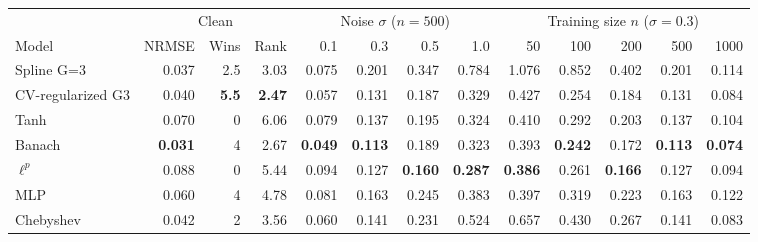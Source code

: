 \begin{tabular}{lrrrrrrrrrrrr}
\toprule
& \multicolumn{3}{c}{Clean} & \multicolumn{4}{c}{Noise $\sigma$ ($n=500$)} & \multicolumn{5}{c}{Training size $n$ ($\sigma=0.3$)} \\
\cmidrule(lr){2-4}\cmidrule(lr){5-8}\cmidrule(lr){9-13}
Model & NRMSE & Wins & Rank & 0.1 & 0.3 & 0.5 & 1.0 & 50 & 100 & 200 & 500 & 1000 \\
\midrule
Spline G=3 & 0.037 & 2.5 & 3.03 & 0.075 & 0.201 & 0.347 & 0.784 & 1.076 & 0.852 & 0.402 & 0.201 & 0.114 \\
CV-regularized G3 & 0.040 & \textbf{5.5} & \textbf{2.47} & 0.057 & 0.131 & 0.187 & 0.329 & 0.427 & 0.254 & 0.184 & 0.131 & 0.084 \\
Tanh & 0.070 & 0 & 6.06 & 0.079 & 0.137 & 0.195 & 0.324 & 0.410 & 0.292 & 0.203 & 0.137 & 0.104 \\
Banach & \textbf{0.031} & 4 & 2.67 & \textbf{0.049} & \textbf{0.113} & 0.189 & 0.323 & 0.393 & \textbf{0.242} & 0.172 & \textbf{0.113} & \textbf{0.074} \\
$\ell^p$ & 0.088 & 0 & 5.44 & 0.094 & 0.127 & \textbf{0.160} & \textbf{0.287} & \textbf{0.386} & 0.261 & \textbf{0.166} & 0.127 & 0.094 \\
MLP & 0.060 & 4 & 4.78 & 0.081 & 0.163 & 0.245 & 0.383 & 0.397 & 0.319 & 0.223 & 0.163 & 0.122 \\
Chebyshev & 0.042 & 2 & 3.56 & 0.060 & 0.141 & 0.231 & 0.524 & 0.657 & 0.430 & 0.267 & 0.141 & 0.083 \\
\bottomrule
\end{tabular}

